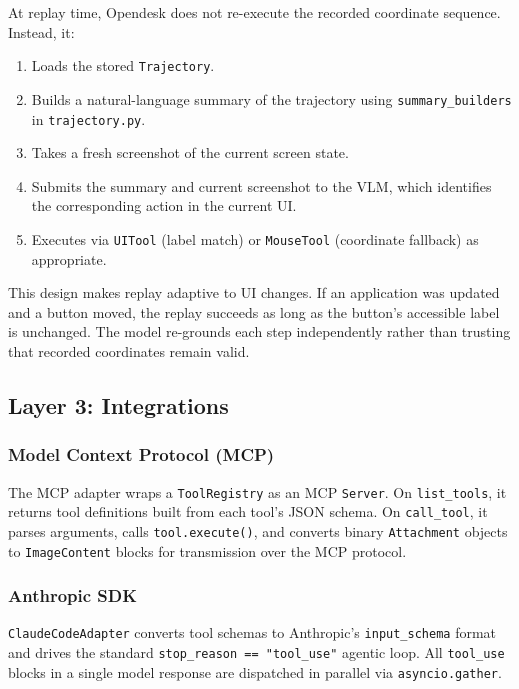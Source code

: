 \documentclass[11pt]{article}
\begin{document}
At replay time, Opendesk does not re-execute the recorded coordinate sequence. Instead, it:

\begin{enumerate}
    \item Loads the stored \texttt{Trajectory}.
    \item Builds a natural-language summary of the trajectory using \texttt{summary\_builders} in \texttt{trajectory.py}.
    \item Takes a fresh screenshot of the current screen state.
    \item Submits the summary and current screenshot to the VLM, which identifies the corresponding action in the current UI.
    \item Executes via \texttt{UITool} (label match) or \texttt{MouseTool} (coordinate fallback) as appropriate.
\end{enumerate}

This design makes replay adaptive to UI changes. If an application was updated and a button moved, the replay succeeds as long as the button's accessible label is unchanged. The model re-grounds each step independently rather than trusting that recorded coordinates remain valid.

\subsection{Layer 3: Integrations}

\subsubsection{Model Context Protocol (MCP)}

The MCP adapter wraps a \texttt{ToolRegistry} as an MCP \texttt{Server}. On \texttt{list\_tools}, it returns tool definitions built from each tool's JSON schema. On \texttt{call\_tool}, it parses arguments, calls \texttt{tool.execute()}, and converts binary \texttt{Attachment} objects to \texttt{ImageContent} blocks for transmission over the MCP protocol.

\subsubsection{Anthropic SDK}

\texttt{ClaudeCodeAdapter} converts tool schemas to Anthropic's \texttt{input\_schema} format and drives the standard \texttt{stop\_reason == "tool\_use"} agentic loop. All \texttt{tool\_use} blocks in a single model response are dispatched in parallel via \texttt{asyncio.gather}.
\end{document}
